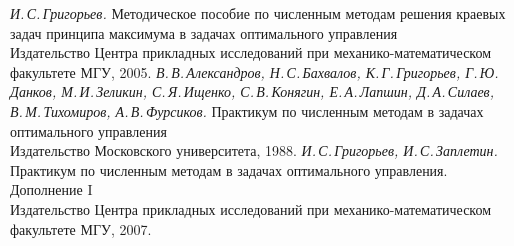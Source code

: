 \newpage
\begin{thebibliography}{99} 
{\em И.\,С.\,Григорьев.} Методическое пособие по численным методам решения краевых задач принципа 
максимума в задачах оптимального управления \\ Издательство Центра прикладных исследований 
при механико-математическом факультете МГУ, 2005. 
{\em В.\,В.\,Александров, Н.\,С.\,Бахвалов, К.\,Г.\,Григорьев, Г.\,Ю.\,Данков, М.\,И.\,Зеликин, С.\,Я.\,Ищенко, 
С.\,В.\,Конягин, Е.\,А.\,Лапшин, Д.\,А.\,Силаев, В.\,М.\,Тихомиров, А.\,В.\,Фурсиков.} Практикум по 
численным методам в задачах оптимального управления \\ Издательство Московского университета, 1988. 
{\em И.\,С.\,Григорьев, И.\,С.\,Заплетин.} Практикум по численным методам в задачах оптимального управления. Дополнение I \\ Издательство Центра прикладных 
исследований при механико-математическом факультете МГУ, 2007. 
\end{thebibliography}